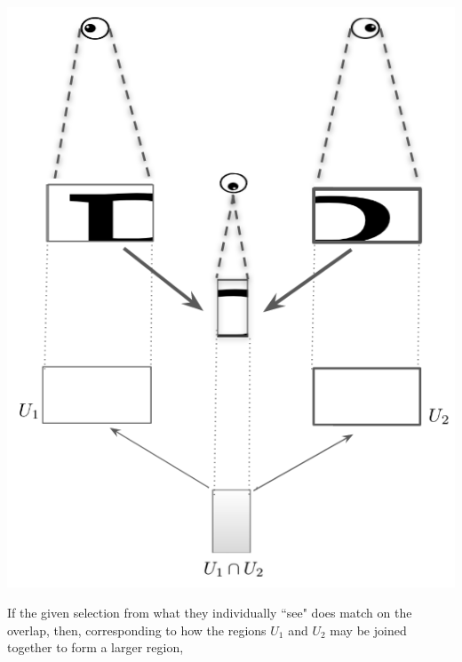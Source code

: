 \documentclass[a4paper]{book}
\theoremstyle{definition}
\theoremstyle{definition}
\theoremstyle{definition}
\theoremstyle{theorem}
\theoremstyle{definition}
\begin{document}
	\begin{center}
		\includegraphics[scale=0.25]{3Diagram.png}
	\end{center}
	If the given selection from what they individually ``see" does match on the overlap, then, corresponding to how the regions $U_1$ and $U_2$ may be joined together to form a larger region, 
\end{document}
